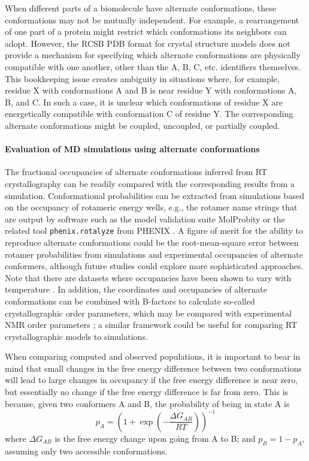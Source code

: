 \documentclass[9pt,review,pubversion]{livecoms}
\begin{document}
When different parts of a biomolecule have alternate conformations, these conformations may not be mutually independent.
For example, a rearrangement of one part of a protein might restrict which conformations its neighbors can adopt.
However, the RCSB PDB format for crystal structure models does not provide a mechanism for specifying which alternate conformations are physically compatible with one another, other than the A, B, C, etc. identifiers themselves.
This bookkeeping issue creates ambiguity in situations where, for example, residue X with conformations A and B is near residue Y with conformations A, B, and C.
In such a case, it is unclear which conformations of residue X are energetically compatible with conformation C of residue Y.
The corresponding alternate conformations might be coupled, uncoupled, or partially coupled.

\paragraph{Evaluation of MD simulations using alternate conformations}

The fractional occupancies of alternate conformations inferred from RT crystallography can be readily compared with the corresponding results from a simulation.
Conformational probabilities can be extracted from simulations based on the occupancy of rotameric energy wells, e.g., the rotamer name strings \cite{lovell_penultimate_2000} that are output by software such as the model validation suite MolProbity \cite{williams_molprobity_2018} or the related tool \verb|phenix.rotalyze| from PHENIX \cite{liebschner_macromolecular_2019}.
A figure of merit for the ability to reproduce alternate conformations could be the root-mean-square error between rotamer probabilities from simulations and experimental occupancies of alternate conformers, although future studies could explore more sophisticated approaches.
Note that there are datasets where occupancies have been shown to vary with temperature \cite{bradford_temperature_2021}.
In addition, the coordinates and occupancies of alternate conformations can be combined with B-factors to calculate so-called crystallographic order parameters, which may be compared with experimental NMR order parameters \cite{fenwick_integrated_2014}; a similar framework could be useful for comparing RT crystallographic models to simulations.

When comparing computed and observed populations, it is important to bear in mind that small changes in the free energy difference between two conformations will lead to large changes in occupancy if the free energy difference is near zero, but essentially no change if the free energy difference is far from zero.
This is because, given two conformers A and B, the probability of being in state A is
\begin{equation}
\label{eqn:alt_confs}
p_A = \left( 1 + \exp \left(- \frac {\Delta G_{AB}} {R T} \right) \right )^{-1}
\end{equation}
\noindent where $\Delta G_{AB}$ is the free energy change upon going from A to B; and $p_B = 1-p_A$, assuming only two accessible conformations.
\end{document}
